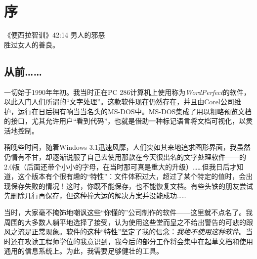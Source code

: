 \chapter*{序}

\begin{epigraphe}{《便西拉智训》42:14}
    男人的邪恶\\胜过女人的善良。
\end{epigraphe}

\section*{从前……}

一切始于1990年年初。我当时正在PC 286计算机上使用称为\emph{WordPerfect}的软件，以此入门人们所谓的“文字处理”。这款软件现在仍然存在，并且由Corel公司维护，运行在日后拥有响当当名头的MS-DOS中。MS-DOS集成了用以粗略预览文档的接口，尤其允许用户“看到代码”，也就是借助一种标记语言将文档可视化，以灵活地控制。

稍晚些时间，随着Windows 3.1迅速风靡，人们突如其来地追求图形界面，我虽然仍情有不甘，却逐渐说服了自己去使用那款在今天很出名的文字处理软件——的2.0版（后面还带个小小的字母，在当时那可真是重大的升级）……但我日后才知道，这个版本有个很有趣的“特性”：文件体积过大，超过了某个特定的值时，会出现保存失败的情况！这时，你既不能保存，也不能恢复文档。有些头铁的朋友尝试先删除几行再保存，但这种撞大运的解决方案并没能成功……

当时，大家毫不掩饰地嘲讽这些“你懂的”公司制作的软件——这里就不点名了。我周围的大多数人躺平地选择了接受，认为使用这些堂而皇之不给出警告的可悲的跟风之流是正常现象。软件的这种“特性”坚定了我的信念：\emph{我绝不使用这种软件}。当时还在攻读工程师学位的我意识到，我今后的部分工作将会集中在起草文档和使用通用的信息系统上。为此，我需要足够健壮的工具。

